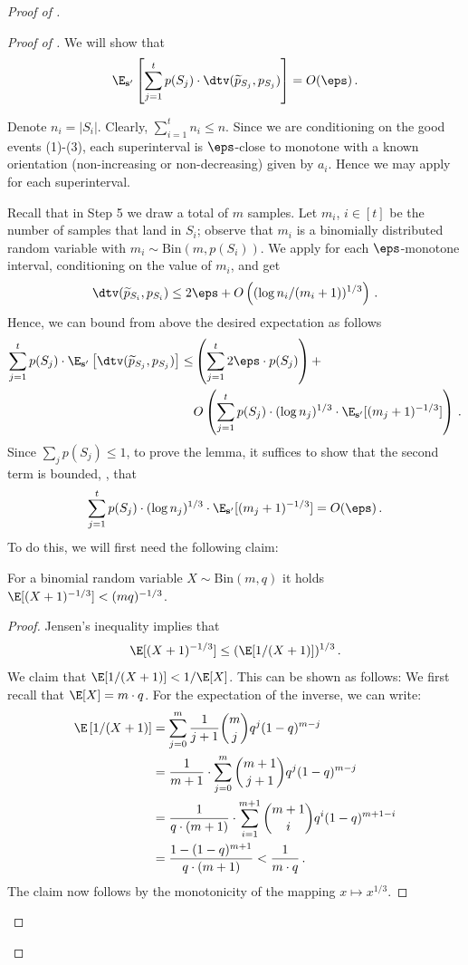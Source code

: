 \begin{proof}[Proof of ]
\begin{proof}[Proof of ]
We will show that
$$
\E_{\mathbf{s}'} \left[  \sum_{j=1}^{t} p(S_j) \cdot \dtv (\widetilde{p}_{S_j}, p_{S_j}) \right] = O(\eps)\,.
$$

Denote $n_i = |S_i|$. Clearly,  $\sum_{i=1}^{t} n_i \leq n$.
Since we are conditioning on the good events (1)-(3), each superinterval is
$\eps$-close to monotone with a known orientation (non-increasing or
non-decreasing) given by $a_i$.  Hence we may apply  for each superinterval.

Recall that in Step 5 we draw a total of $m$ samples. Let $m_i$, $i \in [t]$ be the number of samples that land in $S_i$;
observe that $m_i$ is a binomially distributed random variable with
$m_i \sim \mathrm{Bin}(m, p(S_i))$.
We apply  for each $\eps$-monotone interval,
conditioning on the value of $m_i$, and get
$$ \dtv (\widetilde{p}_{S_i}, p_{S_i})  \leq 2 \eps +  O\left( (\log n_i / (m_i+1))^{1/3} \right)\,.$$ Hence, we can bound from above
the desired expectation as follows
\begin{equation*}
  \begin{split}
    \sum_{j=1}^{t} p(S_j) \cdot \E_{\mathbf{s}'} \left[ \dtv (\widetilde{p}_{S_j}, p_{S_j}) \right]
    \leq& \left(\sum_{j=1}^{t} 2 \eps \cdot p(S_j) \right) + \\
    &O\left(\sum_{j=1}^{t} p(S_j) \cdot  (\log n_j)^{1/3} \cdot
      \E_{\mathbf{s}'} [ (m_j+1)^{-1/3}]\right)\,.
  \end{split}
\end{equation*}
Since $\sum_jp(S_j) \leq 1$, to prove the lemma, it suffices to show that the second term is bounded, \ie,
that
$$\sum_{j=1}^{t} p(S_j) \cdot  (\log n_j)^{1/3} \cdot \E_{\mathbf{s}'} [ (m_j+1)^{-1/3}] = O(\eps)\,.$$
To do this, we will first need the following claim:
\begin{claim} \label{claim:binomial}
For a binomial random variable $X \sim \mathrm{Bin}(m,q)$ it holds $\E [ (X+1)^{-1/3} ] <(mq)^{-1/3}$.
\end{claim}

\begin{proof} %
Jensen's inequality %
implies that $$\E [(X+1)^{-1/3}] \leq  (\E [1/(X+1)])^{1/3}\,.$$
We claim that $\E [1/(X+1)] < 1/\E[X]$. This can be shown as follows:
We first recall that $\E[X] = m \cdot q$. For the expectation of the inverse,
we can write:
%
%
%
%
\begin{align*}
\E\left[1/(X+1)\right]  &= \sum_{j=0}^m {\frac{1}{j+1} \binom{m}{j}q^j (1-q)^{m-j}} \\
&= \frac{1}{m+1}
\cdot \sum_{j=0}^m {\binom{m+1}{j+1} q^j (1-q)^{m-j}}\\
&=  \frac{1}{q \cdot (m+1)} \cdot \sum_{i=1}^{m+1} {\binom{m+1}{i} q^i (1-q)^{m+1-i}} \\
&= \frac{1 - (1-q)^{m+1}}{q \cdot (m+1)}  < \frac{1}{m \cdot q}\,.
\end{align*}
The claim now follows by the monotonicity of the mapping $x \mapsto x^{1/3}$.
\end{proof}
%


\end{proof}
\end{proof}
